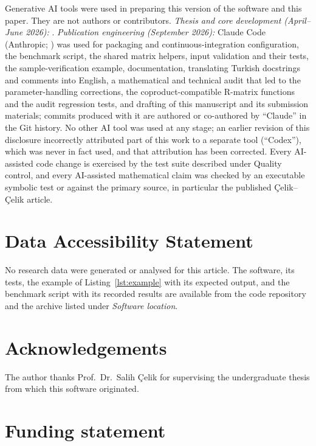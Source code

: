 \documentclass[11pt,a4paper]{article}
\begin{document}
Generative AI tools were used in preparing this version of the software and this paper. They are not authors or contributors. \emph{Thesis and core development (April--June 2026):} \ThesisPeriodAI. \emph{Publication engineering (September 2026):} Claude Code (Anthropic; \ClaudeModel) was used for packaging and continuous-integration configuration, the benchmark script, the shared matrix helpers, input validation and their tests, the sample-verification example, documentation, translating Turkish docstrings and comments into English, a mathematical and technical audit that led to the parameter-handling corrections, the coproduct-compatible R-matrix functions and the audit regression tests, and drafting of this manuscript and its submission materials; commits produced with it are authored or co-authored by ``Claude'' in the Git history. No other AI tool was used at any stage; an earlier revision of this disclosure incorrectly attributed part of this work to a separate tool (``Codex''), which was never in fact used, and that attribution has been corrected. Every AI-assisted code change is exercised by the test suite described under Quality control, and every AI-assisted mathematical claim was checked by an executable symbolic test or against the primary source, in particular the published Çelik--Çelik article. \AIReviewStatement

\section*{Data Accessibility Statement}

No research data were generated or analysed for this article. The software, its tests, the example of Listing~\ref{lst:example} with its expected output, and the benchmark script with its recorded results are available from the code repository and the archive listed under \emph{Software location}.

\section*{Acknowledgements}

The author thanks Prof.\ Dr.\ Salih Çelik for supervising the undergraduate thesis from which this software originated.

\section*{Funding statement}

\FundingText
\end{document}
